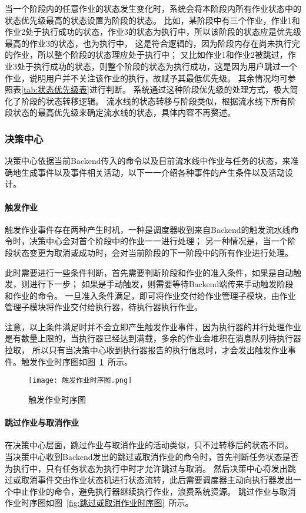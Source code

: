 当一个阶段内的任意作业的状态发生变化时，系统会将本阶段内所有作业状态中的状态优先级最高的状态设置为阶段的状态。
比如，某阶段中有三个作业，作业1和作业2处于执行成功的状态，作业3的状态为执行中，所以该阶段的状态应是优先级最高的作业3的状态，也为执行中，
这是符合逻辑的，因为阶段内存在尚未执行完的作业，所以整个阶段的状态理应处于执行中；
又比如作业1和作业2被跳过，作业3处于执行成功的状态，则整个阶段的状态为执行成功，这是因为用户跳过一个作业，说明用户并不关注该作业的执行，故赋予其最低优先级。
其余情况均可参照表\ref{tab:状态优先级表}进行判断。
系统通过这种阶段优先级的处理方式，极大简化了阶段的状态转移逻辑。
流水线的状态转移与阶段类似，根据流水线下所有阶段状态的最高优先级来确定流水线的状态，具体内容不再赘述。

\subsubsection{决策中心}
决策中心依据当前Backend传入的命令以及目前流水线中作业与任务的状态，来准确地生成事件以及事件相关活动，以下一一介绍各种事件的产生条件以及活动设计。

\paragraph{触发作业}
触发作业事件存在两种产生时机，一种是调度器收到来自Backend的触发流水线命令时，决策中心会对首个阶段中的作业一一进行处理；
另一种情况是，当一个阶段状态变更为取消或成功时，会对当前阶段的下一阶段中的所有作业进行处理。

此时需要进行一些条件判断，首先需要判断阶段和作业的准入条件，如果是自动触发，则进行下一步；
如果是手动触发，则需要等待Backend端传来手动触发阶段和作业的命令。
一旦准入条件满足，即可将作业交付给作业管理子模块，由作业管理子模块将作业交付给执行器，待执行器执行作业。

注意，以上条件满足时并不会立即产生触发作业事件，因为执行器的并行处理作业是有数量上限的，当执行器已经达到满载，多余的作业会堆积在消息队列待执行器拉取，
所以只有当决策中心收到执行器报告的执行信息时，才会发出触发作业事件。触发作业时序图如图~\ref{fig:触发作业时序图}~所示。

\begin{figure}[h]
  \centering
  \texttt{[image: 触发作业时序图.png]}
  \caption{触发作业时序图}
  \label{fig:触发作业时序图}
\end{figure}

\paragraph{跳过作业与取消作业}
在决策中心层面，跳过作业与取消作业的活动类似，只不过转移后的状态不同。
当决策中心收到Backend发出的跳过或取消作业的命令时，首先判断任务状态是否为执行中，只有任务状态为执行中时才允许跳过与取消。
然后决策中心将发出跳过或取消事件交由作业状态机进行状态流转，此后需要调度器主动向执行器发出一个中止作业的命令，避免执行器继续执行作业，浪费系统资源。
跳过作业与取消作业时序图如图~\ref{fig:跳过或取消作业时序图}~所示。

